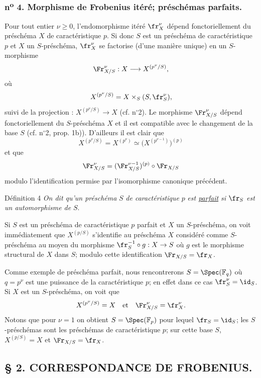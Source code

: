\subsubsection*{n\textsuperscript{o} 4. Morphisme de Frobenius itéré; préschémas parfaits.}

Pour tout entier $\nu\geq 0$, l'endomorphisme itéré $\fr_X^\nu$ dépend fonctoriellement du préschéma $X$ de caractéristique $p$. Si donc $S$ est un préschéma de caractéristique $p$ et $X$ un $S$-préschéma, $\fr_X^\nu$ se factorise (d'une manière unique) en un $S$-morphisme
\[
\Fr_{X/S}^\nu:X\longrightarrow X^{(p^\nu/S)},
\]
où
\[
X^{(p^\nu/S)}=X\times_S(S,\fr_S^\nu),
\]
suivi de la projection : $X^{(p^\nu/S)}\to X$ (cf. n$^\circ$2). Le morphisme $\Fr_{X/S}^\nu$ dépend fonctoriellement du $S$-préschéma $X$ et il est compatible avec le changement de la base $S$ (cf. n$^\circ$2, prop. 1b)). D'ailleurs il est clair que
\[
X^{(p^\nu/S)}=X^{(p^\nu)}\simeq\bigl(X^{(p^{\nu-1})}\bigr)^{(p)}
\]
et que
\[
\Fr_{X/S}^\nu=(\Fr_{X/S}^{\nu-1})^{(p)}\circ\Fr_{X/S}
\]
modulo l'identification permise par l'isomorphisme canonique précédent.

\begin{statement}{Définition 4}
\emph{On dit qu'un préschéma} $S$ \emph{de caractéristique} $p$ \emph{est \underline{parfait} si} $\fr_S$ \emph{est un automorphisme de} $S$.
\end{statement}

Si $S$ est un préschéma de caractéristique $p$ parfait et $X$ un $S$-préschéma, on voit immédiatement que $X^{(p/S)}$ s'identifie au préschéma $X$ considéré comme $S$-préschéma au moyen du morphisme $\fr_S^{-1}\circ g:X\to S$ où $g$ est le morphisme structural de $X$ dans $S$; modulo cette identification $\Fr_{X/S}=\fr_X$.

Comme exemple de préschéma parfait, nous rencontrerons $S=\Spec(\mathbb{F}_q)$ où $q=p^\nu$ est une puissance de la caractéristique $p$; en effet dans ce cas $\fr_S^\nu=\id_S$. Si $X$ est un $S$-préschéma, on voit 
que
\[
X^{(p^\nu/S)}=X
\quad\text{et}\quad
\Fr_{X/S}^\nu=\fr_X^\nu.
\]
Notons que pour $\nu=1$ on obtient $S=\Spec(\mathbb{F}_p)$ pour lequel $\fr_S=\id_S$; les $S$-préschémas sont les préschémas de caractéristique $p$; sur cette base $S$, $X^{(p/S)}=X$ et $\Fr_{X/S}=\fr_X$.

\subsection*{§ 2. CORRESPONDANCE DE FROBENIUS.}

